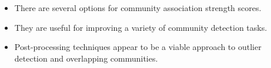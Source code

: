 \documentclass{beamer}
\begin{document}
\begin{frame}{}
    \begin{itemize}
        \color{darkblue}
        \item There are several options for community association strength scores.
        \item They are useful for improving a variety of community detection tasks.
        \item Post-processing techniques appear to be a viable approach to outlier detection and overlapping communities.
    \end{itemize}
\end{frame}

\begin{frame}[allowframebreaks]{}
    
\end{frame}
\end{document}
